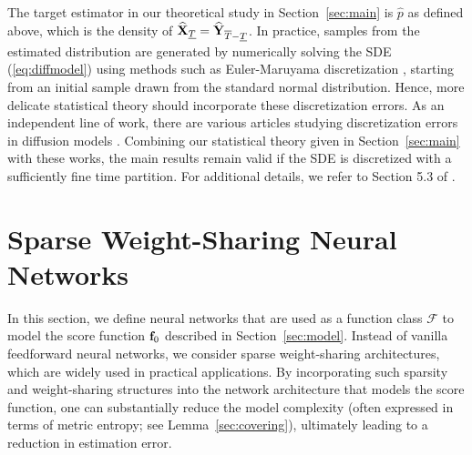 \documentclass[twoside,11pt]{article}
\def\cF{\mathcal F}
\newcommand{\bff}{{\bf f}}
\newcommand{\bX}{{\bf X}}
\newcommand{\bY}{{\bf Y}}
\begin{document}
\begin{remark}
The target estimator in our theoretical study in Section~\ref{sec:main} is $\widehat p$ as defined above, which is the density of $\widehat \bX_{\underline{T}} = \widehat \bY_{\overline{T}-\underline{T}}$. In practice, samples from the estimated distribution are generated by numerically solving the SDE (\ref{eq:diffmodel}) using methods such as Euler-Maruyama discretization \citep{kloeden2011numerical, song2021scorebased}, starting from an initial sample drawn from the standard normal distribution.
Hence, more delicate statistical theory should incorporate these discretization errors. As an independent line of work, there are various articles studying discretization errors in diffusion models \citep{oko2023diffusion, chen2023sampling, nakano2024convergence, debortoli2022convergence, benton2024nearly, chen2023probability, li2024towards, liang2025low}.
Combining our statistical theory given in Section~\ref{sec:main} with these works, the main results remain valid if the SDE is discretized with a sufficiently fine time partition. For additional details, we refer to Section 5.3 of \citet{oko2023diffusion}.
\end{remark}




\section{Sparse Weight-Sharing Neural Networks}
\label{sec:wsnn}

In this section, we define neural networks that are used as a function class $\cF$ to model the score function $\bff_0$ described in Section~\ref{sec:model}. Instead of vanilla feedforward neural networks, we consider sparse weight-sharing architectures, which are widely used in practical applications. By incorporating such sparsity and weight-sharing structures into the network architecture that models the score function, one can substantially reduce the model complexity (often expressed in terms of metric entropy; see Lemma~\ref{sec:covering}), ultimately leading to a reduction in estimation error.
\end{document}
